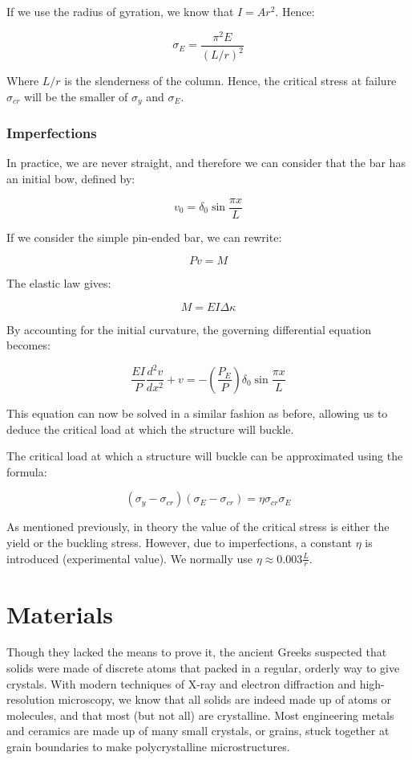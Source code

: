 \documentclass{article}
\begin{document}
If we use the radius of gyration, we know that $I = Ar^2$. Hence:

\[ \sigma_E = \frac{\pi^2 E}{(L/r)^2} \]

Where $L/r$ is the slenderness of the column. Hence, the critical stress at failure $\sigma_{cr}$ will be the smaller of $\sigma_y$ and $\sigma_E$.

\subsubsection{Imperfections}

In practice, we are never straight, and therefore we can consider that the bar has an initial bow, defined by:

\[ v_0 = \delta_0\sin{\frac{\pi x}{L}} \]

If we consider the simple pin-ended bar, we can rewrite:

\[ Pv = M \]

The elastic law gives:

\[ M = EI\Delta\kappa \]

By accounting for the initial curvature, the governing differential equation becomes:

\[ \frac{EI}{P}\frac{d^2v}{dx^2} + v = -\left(\frac{P_E}{P}\right)\delta_0\sin{\frac{\pi x}{L}} \]

This equation can now be solved in a similar fashion as before, allowing us to deduce the critical load at which the structure will buckle.

\begin{theorem}
    The critical load at which a structure will buckle can be approximated using the formula:

    \[ (\sigma_y - \sigma_{cr})(\sigma_E - \sigma_{cr}) = \eta\sigma_{cr}\sigma_E \]
\end{theorem}

As mentioned previously, in theory the value of the critical stress is either the yield or the buckling stress. However, due to imperfections, a constant $\eta$ is introduced (experimental value). We normally use $\eta \approx 0.003 \frac{L}{r}$.

\newpage

\section{Materials}

Though they lacked the means to prove it, the ancient Greeks suspected that solids were made of discrete
atoms that packed in a regular, orderly way to give crystals. With modern techniques of X-ray and
electron diffraction and high-resolution microscopy, we know that all solids are indeed made up of
atoms or molecules, and that most (but not all) are crystalline. Most engineering metals and
ceramics are made up of many small crystals, or grains, stuck together at grain boundaries to make
polycrystalline microstructures.
\end{document}
